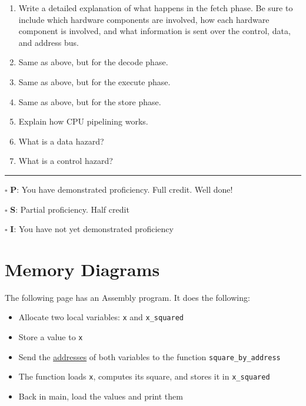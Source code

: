 \documentclass[12pt]{article}
\begin{document}
\begin{enumerate}
\item Write a detailed explanation of what happens in the fetch phase. Be sure to include which hardware components are involved, how each hardware component is involved, and what information is sent over the control, data, and address bus.
\vfill

\item Same as above, but for the decode phase.
\vfill

\item Same as above, but for the execute phase.
\vfill

\item Same as above, but for the store phase.
\vfill

\item Explain how CPU pipelining works.
\vfill

\item What is a data hazard?
\vfill

\item What is a control hazard?
\end{enumerate}

\vfill

\rule[1ex]{\textwidth}{.1pt}

$\square$ \textbf{P}: You have demonstrated proficiency. Full credit. Well done!

$\square$ \textbf{S}: Partial proficiency. Half credit

$\square$ \textbf{I}: You have not yet demonstrated proficiency

\newpage



\section*{Memory Diagrams}

The following page has an Assembly program. It does the following:
\begin{itemize}
    \item Allocate two local variables: \texttt{x} and \texttt{x\_squared}
    \item Store a value to \texttt{x}
    \item Send the \underline{addresses} of both variables to the function \texttt{square\_by\_address}
    \item The function loads \texttt{x}, computes its square, and stores it in \texttt{x\_squared}
    \item Back in main, load the values and print them
\end{itemize}
\end{document}
